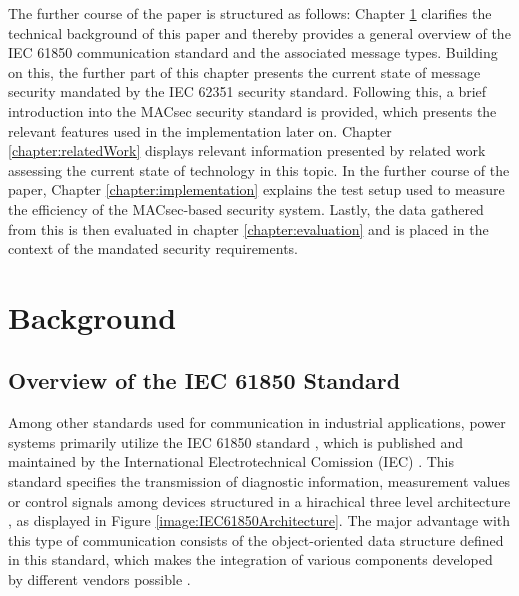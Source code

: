 \documentclass[conference, onecolumn, a4paper]{IEEEtran}
\begin{document}
\smallskip
The further course of the paper is structured as follows: Chapter \ref{chapter:fundamentals} clarifies the technical background of this paper and thereby 
provides a general overview of the IEC 61850 communication standard and the associated  message types. Building on this, the further part of this chapter 
presents the current state of message security mandated by the IEC 62351 security standard. Following this, a brief introduction into the MACsec security 
standard is provided, which presents the relevant features used in the implementation later on. Chapter \ref{chapter:relatedWork} displays relevant 
information presented by related work assessing the current state of technology in this topic. In the further course of the paper, Chapter 
\ref{chapter:implementation} explains the test setup used to measure the efficiency of the MACsec-based security system. Lastly, the data gathered from 
this is then evaluated in chapter \ref{chapter:evaluation} and is placed in the context of the mandated security requirements. 

\section{Background}
\label{chapter:fundamentals}

\subsection{Overview of the IEC 61850 Standard}
\label{subchapter:IEC61850}
Among other standards used for communication in industrial applications, power systems primarily utilize the IEC 61850 standard \cite{IEC61850:2023}, 
which is published and maintained by the International Electrotechnical Comission (IEC) \cite{IEC61850_Overview:2006}. This standard specifies the 
transmission of diagnostic information, measurement values or control signals among devices structured in a hirachical three level architecture 
\cite{SGRWin_IEC61850Architecture:2021}, as displayed in Figure \ref{image:IEC61850Architecture}. The major advantage with this type of communication consists 
of the object-oriented data structure defined in this standard, which makes the integration of various components developed by different vendors possible 
\cite[p. 5643]{Review_IEC62351:2019}. 
\end{document}
